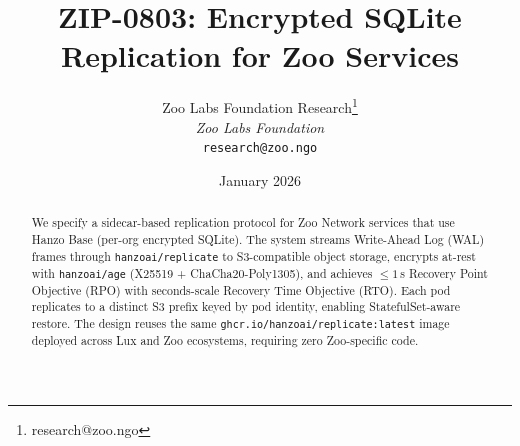 \documentclass[twocolumn,11pt]{article}
\title{\textbf{ZIP-0803: Encrypted SQLite Replication for Zoo Services}}
\author{
Zoo Labs Foundation Research\thanks{research@zoo.ngo}\\
\textit{Zoo Labs Foundation}\\
\texttt{research@zoo.ngo}
}
\date{January 2026}
\begin{document}
\maketitle

\begin{abstract}
We specify a sidecar-based replication protocol for Zoo Network services
that use Hanzo Base (per-org encrypted SQLite).  The system streams
Write-Ahead Log (WAL) frames through \texttt{hanzoai/replicate} to
S3-compatible object storage, encrypts at-rest with \texttt{hanzoai/age}
(X25519 + ChaCha20-Poly1305), and achieves $\leq 1$\,s Recovery Point
Objective (RPO) with seconds-scale Recovery Time Objective (RTO).
Each pod replicates to a distinct S3 prefix keyed by pod identity,
enabling StatefulSet-aware restore.  The design reuses the same
\texttt{ghcr.io/hanzoai/replicate:latest} image deployed across
Lux and Zoo ecosystems, requiring zero Zoo-specific code.
\end{abstract}










\end{document}

